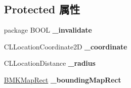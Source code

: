 \subsection*{Protected 属性}
\begin{DoxyCompactItemize}
\item 
\hypertarget{interface_b_m_k_circle_a2dffabfbaa1ac6642adc5a475d6ee453}{}package B\+O\+O\+L {\bfseries \+\_\+invalidate}\label{interface_b_m_k_circle_a2dffabfbaa1ac6642adc5a475d6ee453}

\item 
\hypertarget{interface_b_m_k_circle_abdd404f22d461b81d8d4d203778cee58}{}C\+L\+Location\+Coordinate2\+D {\bfseries \+\_\+coordinate}\label{interface_b_m_k_circle_abdd404f22d461b81d8d4d203778cee58}

\item 
\hypertarget{interface_b_m_k_circle_a84860dbbaa96509cfa4c7590908aabe8}{}C\+L\+Location\+Distance {\bfseries \+\_\+radius}\label{interface_b_m_k_circle_a84860dbbaa96509cfa4c7590908aabe8}

\item 
\hypertarget{interface_b_m_k_circle_abfa42e25c856dd426fb74b9531e1061b}{}\hyperlink{struct_b_m_k_map_rect}{B\+M\+K\+Map\+Rect} {\bfseries \+\_\+bounding\+Map\+Rect}\label{interface_b_m_k_circle_abfa42e25c856dd426fb74b9531e1061b}

\end{DoxyCompactItemize}
